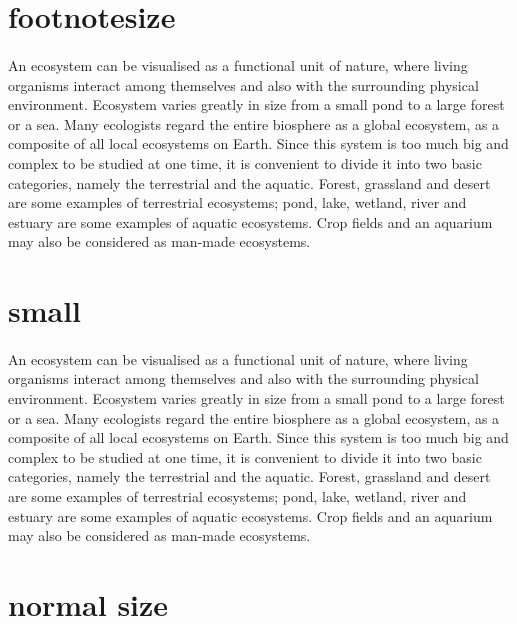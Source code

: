 \documentclass[12pt]{article}
\begin{document}
	\section{footnotesize}
	\paragraph{}
		
		{\footnotesize An ecosystem can be visualised as a functional unit of nature, where living 
			organisms interact among themselves and also with the surrounding physical 
			environment. Ecosystem varies greatly in size from a small pond to a large forest or a 
			sea. Many ecologists regard the entire biosphere as a global ecosystem, as a composite 
			of all local ecosystems on Earth. Since this system is too much big and complex to be 
			studied at one time, it is convenient to divide it into two basic categories, namely the 
			terrestrial and the aquatic. Forest, grassland and desert are some examples of terrestrial 
			ecosystems; pond, lake, wetland, river and estuary are some examples of aquatic 
			ecosystems. Crop fields and an aquarium may also be considered as man-made 
			ecosystems. }
			
	\section{small}
	\paragraph{}
	
	{\small An ecosystem can be visualised as a functional unit of nature, where living 
		organisms interact among themselves and also with the surrounding physical 
		environment. Ecosystem varies greatly in size from a small pond to a large forest or a 
		sea. Many ecologists regard the entire biosphere as a global ecosystem, as a composite 
		of all local ecosystems on Earth. Since this system is too much big and complex to be 
		studied at one time, it is convenient to divide it into two basic categories, namely the 
		terrestrial and the aquatic. Forest, grassland and desert are some examples of terrestrial 
		ecosystems; pond, lake, wetland, river and estuary are some examples of aquatic 
		ecosystems. Crop fields and an aquarium may also be considered as man-made 
		ecosystems. }
	
	\section{normal size}
\end{document}

